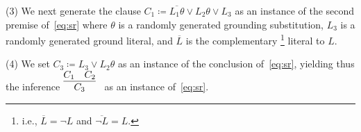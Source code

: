 
\noindent (3)  We next generate the clause
$C_1 \coloneqq \overline{L_1\theta} \lor L_2\theta \lor L_3$
as an instance of the second premise of~\eqref{eq:sr}
where $\theta$ is a randomly generated grounding substitution,
$L_3$ is a randomly generated ground literal,
and
$\overline{L}$ is the complementary%
\footnote{i.e., $\overline{L} = \lnot L$ and $\overline{\lnot L} = L$.}
literal to $L$.\smallskip

\noindent (4)
We set $C_3 \coloneqq L_3 \lor L_2\theta$ as an instance of the
conclusion of~\eqref{eq:sr}, yielding thus the inference $\infer[]{
      C_3
      }{
      C_1
      &
      {C_2}}$ as an instance of~\eqref{eq:sr}.\smallskip

 




